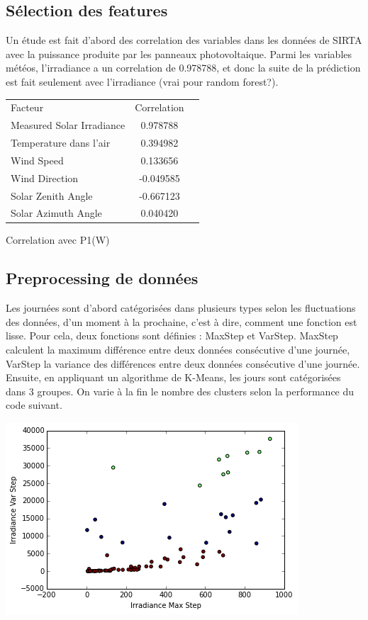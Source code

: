 \documentclass[a4paper]{article}
\begin{document}
\begin{multicols}{2}

\subsection{Sélection des features}
Un étude est fait d’abord des correlation des variables dans les données de SIRTA avec la puissance produite par les panneaux photovoltaique. Parmi les variables météos, l’irradiance a un correlation de 0.978788, et donc la suite de la prédiction est fait seulement avec l’irradiance (vrai pour random forest?).

\begin{tabular}{l c r}
  Facteur & Correlation \\
  Measured Solar Irradiance & 0.978788 \\
  Temperature dans l’air & 0.394982 \\
  Wind Speed & 0.133656 \\
  Wind Direction & -0.049585 \\
  Solar Zenith Angle & -0.667123 \\
  Solar Azimuth Angle & 0.040420 \\
\end{tabular}
\tablename{ Correlation avec P1(W)}

\subsection{Preprocessing de données}

Les journées sont d’abord catégorisées dans plusieurs types selon les fluctuations des données, d’un moment à la prochaine, c’est à dire, comment une fonction est lisse. Pour cela, deux fonctions sont définies : MaxStep et VarStep. MaxStep calculent la maximum différence entre deux données consécutive d’une journée, VarStep la variance des différences entre deux données consécutive d’une journée. Ensuite, en appliquant un algorithme de K-Means, les jours sont catégorisées dans 3 groupes. On varie à la fin le nombre des clusters selon la performance du code suivant.


\includegraphics[width=\textwidth/2]{./categoriesgraph.png}



\end{multicols}
\end{document}
